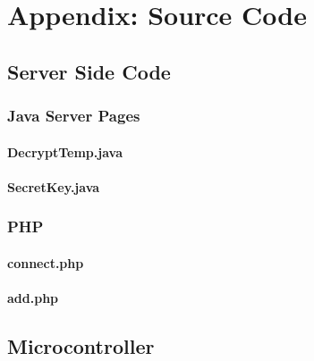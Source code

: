 
\chapter{Appendix: Source Code} %

\label{AppendixA} %

\section{Server Side Code}

\subsection{Java Server Pages}

\subsubsection{DecryptTemp.java}



\subsubsection{SecretKey.java}



\subsection{PHP}

\subsubsection{connect.php}




\subsubsection{add.php}




\section{Microcontroller}

